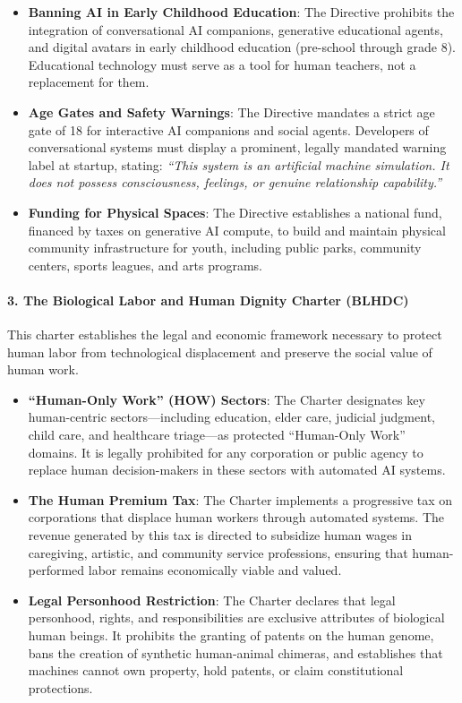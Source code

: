 \begin{itemize}
\tightlist
\item
  \textbf{Banning AI in Early Childhood Education}: The Directive
  prohibits the integration of conversational AI companions, generative
  educational agents, and digital avatars in early childhood education
  (pre-school through grade 8). Educational technology must serve as a
  tool for human teachers, not a replacement for them.
\item
  \textbf{Age Gates and Safety Warnings}: The Directive mandates a
  strict age gate of 18 for interactive AI companions and social agents.
  Developers of conversational systems must display a prominent, legally
  mandated warning label at startup, stating: \emph{``This system is an
  artificial machine simulation. It does not possess consciousness,
  feelings, or genuine relationship capability.''}
\item
  \textbf{Funding for Physical Spaces}: The Directive establishes a
  national fund, financed by taxes on generative AI compute, to build
  and maintain physical community infrastructure for youth, including
  public parks, community centers, sports leagues, and arts programs.
\end{itemize}

\paragraph{3. The Biological Labor and Human Dignity Charter
(BLHDC)}\label{the-biological-labor-and-human-dignity-charter-blhdc}

This charter establishes the legal and economic framework necessary to
protect human labor from technological displacement and preserve the
social value of human work.

\begin{itemize}
\tightlist
\item
  \textbf{``Human-Only Work'' (HOW) Sectors}: The Charter designates key
  human-centric sectors---including education, elder care, judicial
  judgment, child care, and healthcare triage---as protected
  ``Human-Only Work'' domains. It is legally prohibited for any
  corporation or public agency to replace human decision-makers in these
  sectors with automated AI systems.
\item
  \textbf{The Human Premium Tax}: The Charter implements a progressive
  tax on corporations that displace human workers through automated
  systems. The revenue generated by this tax is directed to subsidize
  human wages in caregiving, artistic, and community service
  professions, ensuring that human-performed labor remains economically
  viable and valued.
\item
  \textbf{Legal Personhood Restriction}: The Charter declares that legal
  personhood, rights, and responsibilities are exclusive attributes of
  biological human beings. It prohibits the granting of patents on the
  human genome, bans the creation of synthetic human-animal chimeras,
  and establishes that machines cannot own property, hold patents, or
  claim constitutional protections.
\end{itemize}

